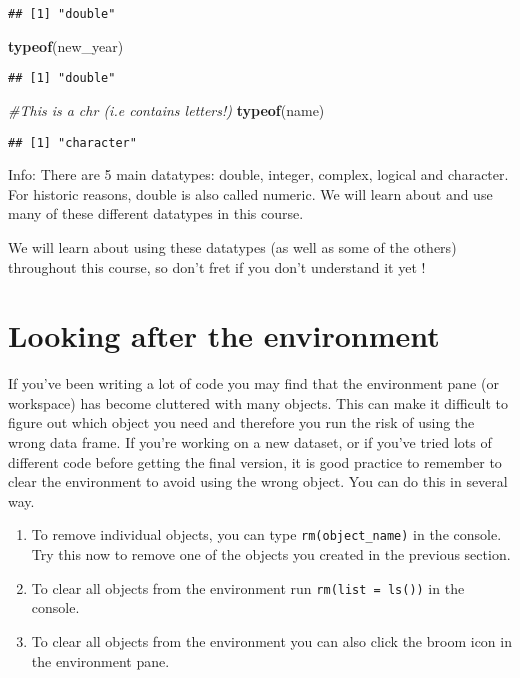 \documentclass[
]{book}
\newenvironment{Shaded}{\begin{snugshade}}{\end{snugshade}}
\newcommand{\CommentTok}[1]{\textcolor[rgb]{0.56,0.35,0.01}{\textit{#1}}}
\newcommand{\FunctionTok}[1]{\textcolor[rgb]{0.13,0.29,0.53}{\textbf{#1}}}
\newcommand{\NormalTok}[1]{#1}
\providecommand{\tightlist}{%
  \setlength{\itemsep}{0pt}\setlength{\parskip}{0pt}}
\begin{document}
\begin{verbatim}
## [1] "double"
\end{verbatim}

\begin{Shaded}
\begin{Highlighting}[]
\FunctionTok{typeof}\NormalTok{(new\_year)}
\end{Highlighting}
\end{Shaded}

\begin{verbatim}
## [1] "double"
\end{verbatim}

\begin{Shaded}
\begin{Highlighting}[]
\CommentTok{\#This is a chr (i.e contains letters!)}
\FunctionTok{typeof}\NormalTok{(name)}
\end{Highlighting}
\end{Shaded}

\begin{verbatim}
## [1] "character"
\end{verbatim}

Info: There are 5 main datatypes: double, integer, complex, logical and character. For historic reasons, double is also called numeric. We will learn about and use many of these different datatypes in this course.

We will learn about using these datatypes (as well as some of the others) throughout this course, so don't fret if you don't understand it yet !

\section{Looking after the environment}\label{looking-after-the-environment}

If you've been writing a lot of code you may find that the environment pane (or workspace) has become cluttered with many objects. This can make it difficult to figure out which object you need and therefore you run the risk of using the wrong data frame. If you're working on a new dataset, or if you've tried lots of different code before getting the final version, it is good practice to remember to clear the environment to avoid using the wrong object. You can do this in several way.

\begin{enumerate}
\def\labelenumi{\arabic{enumi}.}
\tightlist
\item
  To remove individual objects, you can type \texttt{rm(object\_name)} in the console. Try this now to remove one of the objects you created in the previous section.
\item
  To clear all objects from the environment run \texttt{rm(list\ =\ ls())} in the console.
\item
  To clear all objects from the environment you can also click the broom icon in the environment pane.
\end{enumerate}
\end{document}
